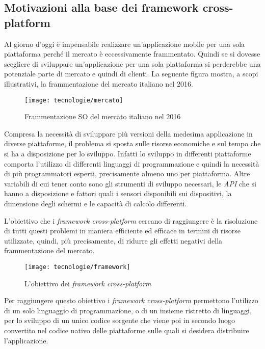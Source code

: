 \subsection{Motivazioni alla base dei framework cross-platform}

Al giorno d'oggi è impensabile realizzare un'applicazione mobile per una sola piattaforma perché il mercato è eccessivamente frammentato. Quindi se si dovesse scegliere di sviluppare un'applicazione per una sola piattaforma si perderebbe una potenziale parte di mercato e quindi di clienti. La seguente figura mostra, a scopi illustrativi, la frammentazione del mercato italiano nel 2016.

\begin{figure}[!h] 
    \centering 
    \texttt{[image: tecnologie/mercato]} 
    \caption{Frammentazione SO del mercato italiano nel 2016}
\end{figure}

Compresa la necessità di sviluppare più versioni della medesima applicazione in diverse piattaforme, il problema si sposta sulle risorse economiche e sul tempo che si ha a disposizione per lo sviluppo. Infatti lo sviluppo in differenti piattaforme comporta l'utilizzo di differenti linguaggi di programmazione e quindi la necessità di più programmatori esperti, precisamente almeno uno per piattaforma. Altre variabili di cui tener conto sono gli strumenti di sviluppo necessari, le \textit{API} che si hanno a disposizione e fattori quali i sensori disponibili sui dispositivi, la dimensione degli schermi e le capacità di calcolo differenti.

L'obiettivo che i \textit{framework cross-platform} cercano di raggiungere è la risoluzione di tutti questi problemi in maniera efficiente ed efficace in termini di risorse utilizzate, quindi, più precisamente, di ridurre gli effetti negativi della frammentazione del mercato.

\begin{figure}[!h] 
    \centering 
    \texttt{[image: tecnologie/framework]} 
    \caption{L'obiettivo dei \textit{framework cross-platform}}
\end{figure}

Per raggiungere questo obiettivo i \textit{framework cross-platform} permettono l'utilizzo di un solo linguaggio di programmazione, o di un insieme ristretto di linguaggi, per lo sviluppo di un unico codice sorgente che viene poi in secondo luogo convertito nel codice nativo delle piattaforme sulle quali si desidera distribuire l'applicazione. 

